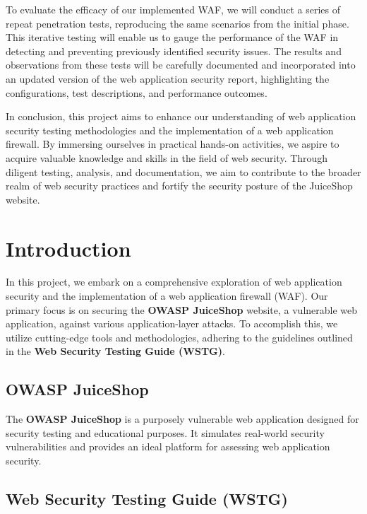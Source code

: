 \documentclass[12pt]{article}
\begin{document}
To evaluate the efficacy of our implemented WAF, we will conduct a series of repeat penetration tests, reproducing the same scenarios from the initial phase. This iterative testing will enable us to gauge the performance of the WAF in detecting and preventing previously identified security issues. The results and observations from these tests will be carefully documented and incorporated into an updated version of the web application security report, highlighting the configurations, test descriptions, and performance outcomes.

In conclusion, this project aims to enhance our understanding of web application security testing methodologies and the implementation of a web application firewall. By immersing ourselves in practical hands-on activities, we aspire to acquire valuable knowledge and skills in the field of web security. Through diligent testing, analysis, and documentation, we aim to contribute to the broader realm of web security practices and fortify the security posture of the JuiceShop website.


\newpage

\section{Introduction}

In this project, we embark on a comprehensive exploration of web application security and the implementation of a web application firewall (WAF). Our primary focus is on securing the \textbf{OWASP JuiceShop} website, a vulnerable web application, against various application-layer attacks. To accomplish this, we utilize cutting-edge tools and methodologies, adhering to the guidelines outlined in the \textbf{Web Security Testing Guide (WSTG)}.

\subsection{OWASP JuiceShop}

The \textbf{OWASP JuiceShop} is a purposely vulnerable web application designed for security testing and educational purposes. It simulates real-world security vulnerabilities and provides an ideal platform for assessing web application security.

\subsection{Web Security Testing Guide (WSTG)}
\end{document}
